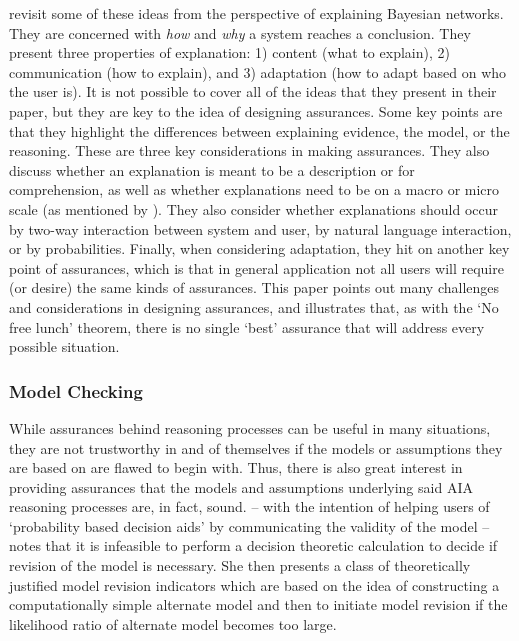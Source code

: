     \citet{Lacave2002-cu} revisit some of these ideas from the perspective of explaining Bayesian networks. They are concerned with \emph{how} and \emph{why} a system reaches a conclusion. They present three properties of explanation: 1) content (what to explain), 2) communication (how to explain), and 3) adaptation (how to adapt based on who the user is). It is not possible to cover all of the ideas that they present in their paper, but they are key to the idea of designing assurances. Some key points are that they highlight the differences between explaining evidence, the model, or the reasoning. These are three key considerations in making assurances. They also discuss whether an explanation is meant to be a description or for comprehension, as well as whether explanations need to be on a macro or micro scale (as mentioned by \citeauthor{Ruping2006-xj}). They also consider whether explanations should occur by two-way interaction between system and user, by natural language interaction, or by probabilities. Finally, when considering adaptation, they hit on another key point of assurances, which is that in general application not all users will require (or desire) the same kinds of assurances. This paper points out many challenges and considerations in designing assurances, and illustrates that, as with the `No free lunch' theorem, there is no single `best' assurance that will address every possible situation.


\subsubsection{Model Checking} \label{sec:model_checking}
    While assurances behind reasoning processes can be useful in many situations, they are not trustworthy in and of themselves if the models or assumptions they are based on are flawed to begin with. Thus, there is also great interest in providing assurances that the models and assumptions underlying said AIA reasoning processes are, in fact, sound. \citet{Laskey1991-mf} -- with the intention of helping users of `probability based decision aids' by communicating the validity of the model -- notes that it is infeasible to perform a decision theoretic calculation to decide if revision of the model is necessary. She then presents a class of theoretically justified model revision indicators which are based on the idea of constructing a computationally simple alternate model and then to initiate model revision if the likelihood ratio of alternate model becomes too large. 

